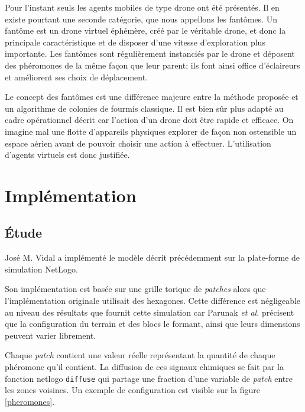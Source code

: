 \documentclass[12pt]{article}
\begin{document}
Pour l'instant seuls les agents mobiles de type drone ont été
présentés. Il en existe pourtant une seconde catégorie, que nous
appellons les fantômes. Un fantôme est un drone virtuel éphémère, créé
par le véritable drone, et donc la principale caractéristique et de
disposer d'une vitesse d'exploration plus importante. Les fantômes
sont régulièrement instanciés par le drone et déposent des phéromones
de la même façon que leur parent; ils font ainsi office d'éclaireurs
et améliorent ses choix de déplacement.

Le concept des fantômes est une différence majeure entre la méthode
proposée et un algorithme de colonies de fourmis classique. Il est
bien sûr plus adapté au cadre opérationnel décrit car l'action d'un
drone doit être rapide et efficace. On imagine mal une flotte
d'appareils physiques explorer de façon non ostensible un espace
aérien avant de pouvoir choisir une action à effectuer. L'utilisation
d'agents virtuels est donc justifiée.

\section{Implémentation}

\subsection{\'Etude}

José M. Vidal a implémenté le modèle décrit précédemment sur la
plate-forme de simulation NetLogo.

Son implémentation est basée sur une grille torique de
\textit{patches} alors que l'implémentation originale utilisait des
hexagones. Cette différence est négligeable au niveau des résultats
que fournit cette simulation car Parunak \textit{et al.} précisent que
la configuration du terrain et des blocs le formant, ainsi que leurs
dimensions peuvent varier librement.

Chaque \textit{patch} contient une valeur réelle représentant la
quantité de chaque phéromone qu'il contient. La diffusion de ces
signaux chimiques se fait par la fonction netlogo \texttt{diffuse} qui
partage une fraction d'une variable de \textit{patch} entre les zones
voisines. Un exemple de configuration est visible sur la figure
\ref{pheromones}.
\end{document}
